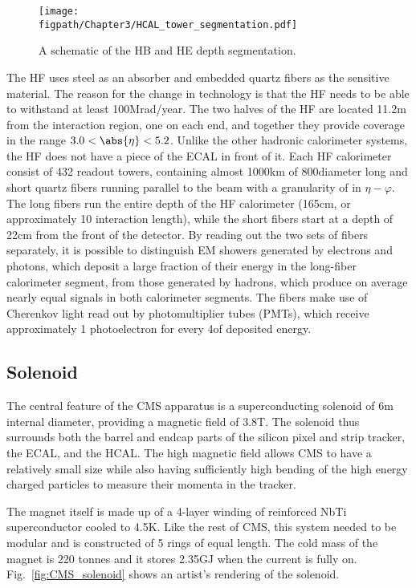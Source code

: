 \begin{figure}[!hbt]
    \centering
    \texttt{[image: \\figpath/Chapter3/HCAL\_tower\_segmentation.pdf]}
    \caption{A schematic of the HB and HE depth segmentation.}
    \label{fig:CMS_HCAL_depth}
\end{figure}

The HF uses steel as an absorber and embedded quartz fibers as the sensitive material.
The reason for the change in technology is that the HF needs to be able to withstand at least 100\unit{Mrad/year}.
The two halves of the HF are located 11.2\unit{m} from the interaction region, one on each end, and together they provide coverage in the range $3.0<\abs{\eta}<5.2$.
Unlike the other hadronic calorimeter systems, the HF does not have a piece of the ECAL in front of it.
Each HF calorimeter consist of 432 readout towers, containing almost 1000\unit{km} of 800\mum diameter long and short quartz fibers running parallel to the beam with a granularity of  in $\eta-\varphi$.
The long fibers run the entire depth of the HF calorimeter (165\unit{cm}, or approximately 10 interaction length), while the short fibers start at a depth of 22\unit{cm} from the front of the detector.
By reading out the two sets of fibers separately, it is possible to distinguish EM showers generated by electrons and photons, which deposit a large fraction of their energy in the long-fiber calorimeter segment, from those generated by hadrons, which produce on average nearly equal signals in both calorimeter segments.
The fibers make use of Cherenkov light read out by photomultiplier tubes (PMTs), which receive approximately 1 photoelectron for every 4\gev of deposited energy.

\subsection{Solenoid}

The central feature of the CMS apparatus is a superconducting solenoid of 6\unit{m} internal diameter, providing a magnetic field of 3.8\unit{T}.
The solenoid thus surrounds both the barrel and endcap parts of the silicon pixel and strip tracker, the ECAL, and the HCAL.
The high magnetic field allows CMS to have a relatively small size while also having sufficiently high bending of the high energy charged particles to measure their momenta in the tracker.

The magnet itself is made up of a 4-layer winding of reinforced NbTi superconductor cooled to 4.5\unit{K}.
Like the rest of CMS, this system needed to be modular and is constructed of 5 rings of equal length.
The cold mass of the magnet is 220 tonnes and it stores 2.35\unit{GJ} when the current is fully on.
Fig.~\ref{fig:CMS_solenoid} shows an artist's rendering of the solenoid.

